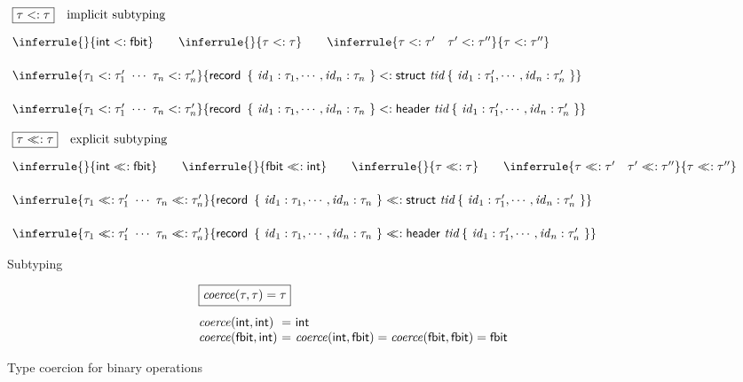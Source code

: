\documentclass{article}
\newcommand{\embox}[1]{\mbox{\emph{#1}}}
\newcommand{\braces}[1]{\left\{\ #1\ \right\}}
\newcommand{\ntid}{\embox{tid}}
\newcommand{\nid}{\embox{id}}
\newcommand{\tstruct}{\mathsf{struct}}
\newcommand{\theader}{\mathsf{header}}
\newcommand{\tfbit}{\mathsf{fbit}}
\newcommand{\tint}{\mathsf{int}}
\newcommand{\trecord}{\mathsf{record}}
\newcommand{\ncoerce}{\embox{coerce}}
\newcommand{\impsub}[2]{#1 <: #2}
\newcommand{\expsub}[2]{#1 <\!\!\!<: #2}
\begin{document}
\begin{figure}[t]
\[
\begin{array}{@{~}l@{~}}
\fbox{$\impsub{\tau}{\tau}$}\quad\mbox{implicit subtyping}\\[1em]
\inferrule{}{\impsub{\tint}{\tfbit}}
\qquad
\inferrule{}{\impsub{\tau}{\tau}}
\qquad
\inferrule{\impsub{\tau}{\tau'}\quad\impsub{\tau'}{\tau''}}
{\impsub{\tau}{\tau''}}
\\[1.5em]
\inferrule{\impsub{\tau_1}{\tau_1'}\ \cdots\ \impsub{\tau_n}{\tau_n'}}
{\impsub{\trecord\ \braces{\nid_1: \tau_1, \cdots, \nid_n: \tau_n}}
  {\tstruct\ \ntid \braces{\nid_1: \tau_1', \cdots, \nid_n: \tau_n'}}}
\\[1.5em]
\inferrule{\impsub{\tau_1}{\tau_1'}\ \cdots\ \impsub{\tau_n}{\tau_n'}}
{\impsub{\trecord\ \braces{\nid_1: \tau_1, \cdots, \nid_n: \tau_n}}
  {\theader\ \ntid \braces{\nid_1: \tau_1', \cdots, \nid_n: \tau_n'}}}
\\\\
\fbox{$\expsub{\tau}{\tau}$}\quad\mbox{explicit subtyping}\\[1em]
\inferrule{}{\expsub{\tint}{\tfbit}}
\qquad
\inferrule{}{\expsub{\tfbit}{\tint}}
\qquad
\inferrule{}{\expsub{\tau}{\tau}}
\qquad
\inferrule{\expsub{\tau}{\tau'}\quad\expsub{\tau'}{\tau''}}
{\expsub{\tau}{\tau''}}
\\[1.5em]
\inferrule{\expsub{\tau_1}{\tau_1'}\ \cdots\ \expsub{\tau_n}{\tau_n'}}
{\expsub{\trecord\ \braces{\nid_1: \tau_1, \cdots, \nid_n: \tau_n}}
  {\tstruct\ \ntid \braces{\nid_1: \tau_1', \cdots, \nid_n: \tau_n'}}}
\\[1.5em]
\inferrule{\expsub{\tau_1}{\tau_1'}\ \cdots\ \expsub{\tau_n}{\tau_n'}}
{\expsub{\trecord\ \braces{\nid_1: \tau_1, \cdots, \nid_n: \tau_n}}
  {\theader\ \ntid \braces{\nid_1: \tau_1', \cdots, \nid_n: \tau_n'}}}
\end{array}
\]
\caption{Subtyping}
\label{fig:sub}
\end{figure}

\begin{figure}[t]
\[
\begin{array}{l@{~}c@{~}l}
\lefteqn{\fbox{$\ncoerce(\tau, \tau) = \tau$}}\\[1em]
\ncoerce(\tint, \tint) &=& \tint\\
\ncoerce(\tfbit, \tint) &=& \ncoerce(\tint, \tfbit) = \ncoerce(\tfbit,  \tfbit) = \tfbit
\end{array}
\]
\caption{Type coercion for binary operations}
\label{fig:coercion}
\end{figure}
\end{document}
